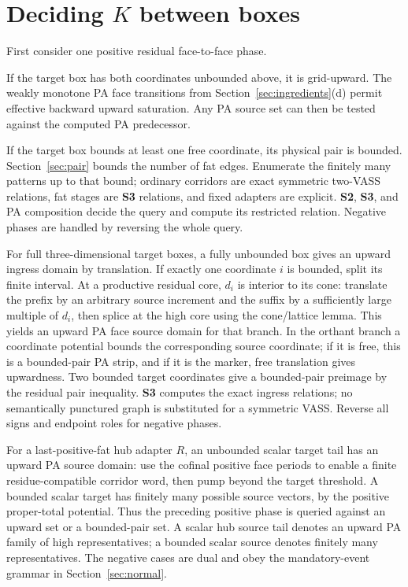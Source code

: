 \documentclass[11pt,a4paper]{article}
\theoremstyle{remark}
\begin{document}
\section[Deciding K between boxes]{Deciding \(K\) between boxes}\label{sec:oracle}

First consider one positive residual face-to-face phase.

If the target box has both coordinates unbounded above, it is grid-upward. The weakly monotone PA face transitions from Section~\ref{sec:ingredients}(d) permit effective backward upward saturation. Any PA source set can then be tested against the computed PA predecessor.

If the target box bounds at least one free coordinate, its physical pair is bounded. Section~\ref{sec:pair} bounds the number of fat edges. Enumerate the finitely many patterns up to that bound; ordinary corridors are exact symmetric two-VASS relations, fat stages are \textbf{S3} relations, and fixed adapters are explicit. \textbf{S2}, \textbf{S3}, and PA composition decide the query and compute its restricted relation. Negative phases are handled by reversing the whole query.

For full three-dimensional target boxes, a fully unbounded box gives an upward ingress domain by translation. If exactly one coordinate \(i\) is bounded, split its finite interval. At a productive residual core, \(d_i\) is interior to its cone: translate the prefix by an arbitrary source increment and the suffix by a sufficiently large multiple of \(d_i\), then splice at the high core using the cone/lattice lemma. This yields an upward PA face source domain for that branch. In the orthant branch a coordinate potential bounds the corresponding source coordinate; if it is free, this is a bounded-pair PA strip, and if it is the marker, free translation gives upwardness. Two bounded target coordinates give a bounded-pair preimage by the residual pair inequality. \textbf{S3} computes the exact ingress relations; no semantically punctured graph is substituted for a symmetric VASS. Reverse all signs and endpoint roles for negative phases.

For a last-positive-fat hub adapter \(R\), an unbounded scalar target tail has an upward PA source domain: use the cofinal positive face periods to enable a finite residue-compatible corridor word, then pump beyond the target threshold. A bounded scalar target has finitely many possible source vectors, by the positive proper-total potential. Thus the preceding positive phase is queried against an upward set or a bounded-pair set. A scalar hub source tail denotes an upward PA family of high representatives; a bounded scalar source denotes finitely many representatives. The negative cases are dual and obey the mandatory-event grammar in Section~\ref{sec:normal}.
\end{document}
